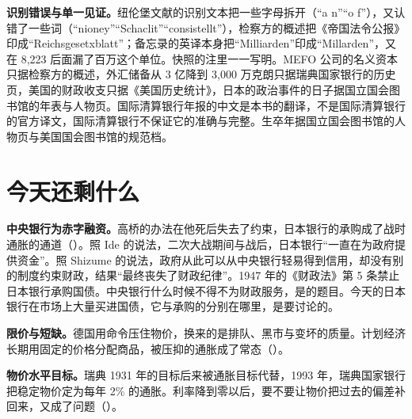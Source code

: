 \begin{deeper}[史料说明]
\textbf{识别错误与单一见证。}纽伦堡文献的识别文本把一些字母拆开（“a n”“o f”），又认错了一些词（“nioney”“Schaclit”“consistellt”），检察方的概述把《帝国法令公报》印成“Reichsgesetxblatt”；备忘录的英译本身把“Milliarden”印成“Millarden”，又在 8,223 后面漏了百万这个单位。快照的注里一一写明。MEFO 公司的名义资本只据检察方的概述，外汇储备从 3 亿降到 3,000 万克朗只据瑞典国家银行的历史页，美国的财政收支只据《美国历史统计》，日本的政治事件的日子据国立国会图书馆的年表与人物页。国际清算银行年报的中文是本书的翻译，不是国际清算银行的官方译文，国际清算银行不保证它的准确与完整。生卒年据国立国会图书馆的人物页与美国国会图书馆的规范档。
\end{deeper}

\section{今天还剩什么}\label{sec:alternatives-legacy}

\textbf{中央银行为赤字融资。}高桥的办法在他死后失去了约束，日本银行的承购成了战时通胀的通道（）。照 Ide 的说法，二次大战期间与战后，日本银行“一直在为政府提供资金”\cite{ide2003}。照 Shizume 的说法，政府从此可以从中央银行轻易得到信用，却没有别的制度约束财政，结果“最终丧失了财政纪律”\cite{shizume2009}。1947 年的《财政法》第 5 条禁止日本银行承购国债\cite{shizume2009}。中央银行什么时候不得不为财政服务，是的题目。今天的日本银行在市场上大量买进国债，它与承购的分别在哪里，是要讨论的。

\textbf{限价与短缺。}德国用命令压住物价，换来的是排队、黑市与变坏的质量。计划经济长期用固定的价格分配商品，被压抑的通胀成了常态（）。

\textbf{物价水平目标。}瑞典 1931 年的目标后来被通胀目标代替，1993 年，瑞典国家银行把稳定物价定为每年 2\% 的通胀\cite{riksbank2026d}。利率降到零以后，要不要让物价把过去的偏差补回来，又成了问题（）。

